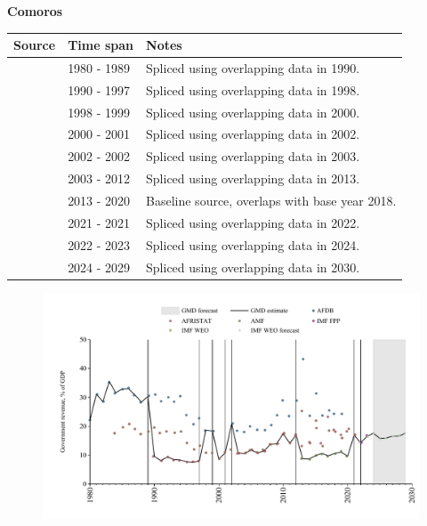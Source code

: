 \documentclass[12pt,a4paper,landscape]{article}
\begin{document}
\begin{adjustbox}{max totalsize={\paperwidth}{\paperheight},center}
\begin{minipage}[t][\textheight][t]{\textwidth}
\vspace*{0.5cm}
{}
\begin{center}
{\Large\bfseries Comoros}
\end{center}
\vspace{0.5cm}
\begin{table}[H]
\centering
\small
\begin{tabular}{|l|l|l|}
\hline
\textbf{Source} & \textbf{Time span} & \textbf{Notes} \\
\hline
\rowcolor{white}\cite{AFDB}& 1980 - 1989 &Spliced using overlapping data in 1990.\\
\rowcolor{lightgray}\cite{AFRISTAT}& 1990 - 1997 &Spliced using overlapping data in 1998.\\
\rowcolor{white}\cite{AFDB}& 1998 - 1999 &Spliced using overlapping data in 2000.\\
\rowcolor{lightgray}\cite{IMF_WEO}& 2000 - 2001 &Spliced using overlapping data in 2002.\\
\rowcolor{white}\cite{AFDB}& 2002 - 2002 &Spliced using overlapping data in 2003.\\
\rowcolor{lightgray}\cite{AFRISTAT}& 2003 - 2012 &Spliced using overlapping data in 2013.\\
\rowcolor{white}\cite{AMF}& 2013 - 2020 &Baseline source, overlaps with base year 2018.\\
\rowcolor{lightgray}\cite{AFRISTAT}& 2021 - 2021 &Spliced using overlapping data in 2022.\\
\rowcolor{white}\cite{IMF_FPP}& 2022 - 2023 &Spliced using overlapping data in 2024.\\
\rowcolor{lightgray}\cite{IMF_WEO_forecast}& 2024 - 2029 &Spliced using overlapping data in 2030.\\
\hline
\end{tabular}
\end{table}
\begin{figure}[H]
\centering
\includegraphics[width=\textwidth,height=0.6\textheight,keepaspectratio]{graphs/COM_govrev_GDP.pdf}
\end{figure}
\end{minipage}
\end{adjustbox}
\end{document}
